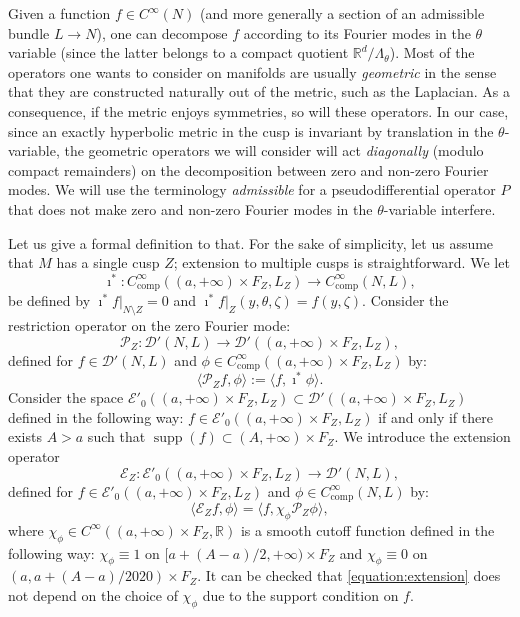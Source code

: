 \documentclass[JEP,XML,SOM,Unicode,NoFloatCountersInSection]{cedram}
\newcommand{\R}{\mathbb{R}}
\newcommand{\mc}{\mathcal}
\DeclareMathOperator{\supp}{supp}
\theoremstyle{plain}
\theoremstyle{definition}
\begin{document}
\label{ssection:admissible}

Given a function $f \in C^\infty(N)$ (and more generally a section of an admissible bundle $L \to N$), one can decompose $f$ according to its Fourier modes in the $\theta$ variable (since the latter belongs to a compact quotient $\R^d/\Lambda_\theta$). Most of the operators one wants to consider on manifolds are usually \emph{geometric} in the sense that they are constructed naturally out of the metric, such as the Laplacian. As a consequence, if the metric enjoys symmetries, so will these operators. In our case, since an exactly hyperbolic metric in the cusp is invariant by translation in the $\theta$-variable, the geometric operators we will consider will act \emph{diagonally} (modulo compact remainders) on the decomposition between zero and non-zero Fourier modes. We will use the terminology \emph{admissible} for a pseudodifferential operator $P$ that does not make zero and non-zero Fourier modes in the $\theta$-variable interfere.

Let us give a formal definition to that. For the sake of simplicity, let us assume that $M$ has a single cusp $Z$; extension to multiple cusps is straightforward. We let
\[
\imath^* : C^\infty_{\mathrm{comp}}((a,+\infty) \times F_Z, L_Z) \to C^\infty_{\mathrm{comp}}(N,L),
\]
be defined by $\imath^*f|_{N \setminus Z} = 0$ and $\imath^*f|_{Z}(y,\theta,\zeta) = f(y,\zeta)$. Consider the restriction operator on the zero Fourier mode:
\[
\mc{P}_Z : \mc{D}'(N,L) \to \mc{D}'((a,+\infty) \times F_Z, L_Z),
\]
defined for $f \in \mc{D}'(N,L)$ and $\phi \in C^\infty_{\mathrm{comp}}((a,+\infty) \times F_Z, L_Z)$ by:
\begin{equation}
\label{equation:restriction}
\langle \mc{P}_Z f, \phi \rangle := \langle f, \imath^* \phi \rangle.
\end{equation}
Consider the space $\mc{E}'_0((a,+\infty) \times F_Z, L_Z) \subset \mc{D}'((a,+\infty) \times F_Z, L_Z)$ defined in the following way: $f \in \mc{E}'_0((a,+\infty) \times F_Z, L_Z)$ if and only if there exists $A > a$ such that $\supp(f) \subset (A,+\infty) \times F_Z$. We introduce the extension operator
\[
\mc{E}_Z : \mc{E}'_0((a,+\infty) \times F_Z, L_Z) \to \mc{D}'(N,L),
\]
defined for $f \in \mc{E}'_0((a,+\infty) \times F_Z, L_Z) $ and $\phi \in C^\infty_{\mathrm{comp}}(N,L)$ by:
\begin{equation}
\label{equation:extension}
\langle \mc{E}_Z f, \phi \rangle = \langle f, \chi_\phi \mc{P}_Z \phi \rangle,
\end{equation}
where $\chi_\phi \in C^\infty((a,+\infty) \times F_Z, \R)$ is a smooth cutoff function defined in the following way: $\chi_\phi \equiv 1$ on $[a + (A-a)/2,+\infty) \times F_Z$ and $\chi_\phi \equiv 0$ on $(a,a+(A-a)/2020) \times F_Z$. It can be checked that \eqref{equation:extension} does not depend on the choice of $\chi_\phi$ due to the support condition on $f$.
\end{document}
